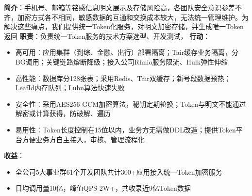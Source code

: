 \documentclass{resume}
\begin{document}
    \begin{onehalfspacing}
        \textbf{简介}：手机号、邮箱等铭感信息明文展示及存储风险高，各团队安全意识参差不齐，加密方式各不相同，敏感数据的互通和交换成本较大，无法统一管理维护。为解决这些痛点，我们提供统一Token化服务，对明文加密存储，并生成唯一Token返回\newline
        \textbf{职责}：负责统一Token服务的技术方案选型、开发测试，\newline
        \textbf{行动}：
        \begin{itemize}
            \item 高可用：应用集群（到综、金融、出行）部署隔离；Tair缓存业务隔离，分BG调用；关键链路熔断降级；接入公司Rhnio服务限流、Hulk弹性伸缩
            \item 高性能：数据库分128张表；采用Redis、Tair双缓存；新号段数据预热；LeafId内存队列；Luhn算法快速失败
            \item 安全性：采用AES256-GCM加密算法，秘钥定期轮换；Token与明文不能通过解密或计算获得，防破解、遍历
            \item 易用性：Token长度控制在15位以内，业务方无需做DDL改造；提供Token平台方便业务方自主接入，审核、管理流程化
        \end{itemize}
        \textbf{收益}：
        \begin{itemize}
            \item 全公司5大事业群61个开发团队共计300+应用接入统一Token加密服务
            \item 日均调用量10亿，峰值QPS 2W+，共收录近9亿Token数据
        \end{itemize}
    \end{onehalfspacing}
    \blankline{ }
\end{document}
